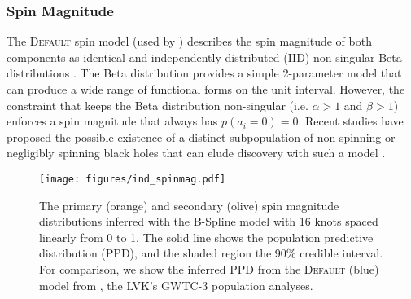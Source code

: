 \subsubsection{Spin Magnitude}

The \textsc{Default} spin model (used by \citet{o3b_astro_dist}) describes the spin magnitude of both components as identical and independently distributed (IID) non-singular Beta distributions \citep{Talbot_2017,Wysocki_2019}.
The Beta distribution provides a simple 2-parameter model that can produce a wide range of functional forms on the unit interval. However, the constraint that keeps 
the Beta distribution non-singular (i.e. $\alpha>1$ and $\beta>1$) enforces a spin magnitude that always has $p(a_i=0) = 0$. Recent studies have proposed the possible existence of a 
distinct subpopulation of non-spinning or negligibly spinning black holes that can elude discovery with such a model \citep{FullerMa2019,RouletGWTC2Pop,BuildBetterSpinModels,Callister_NoEvidence,GWTC3MonashSpin}. 

\begin{figure}[hb!]
    \begin{centering}
        \texttt{[image: figures/ind\_spinmag.pdf]}
        \caption{The primary (orange) and secondary (olive) spin magnitude distributions inferred with the B-Spline model
        with 16 knots spaced linearly from 0 to 1. The solid line shows the population predictive distribution (PPD), and the shaded region the 90\% credible interval. 
        For comparison, we show the inferred PPD from the \textsc{Default} (blue) model from \citet{o3b_astro_dist}, the LVK's GWTC-3 population analyses.}
        \label{fig:ind_spinmag_dist}
    \end{centering}
\end{figure}

